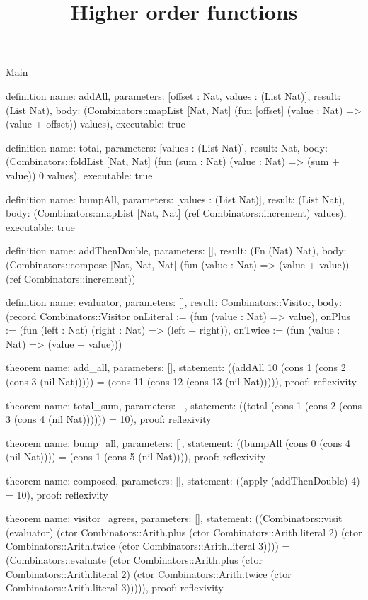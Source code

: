 \begin{lexlean}{Main}
\title{Higher order functions}
\begin{semanticmodule}
definition{
  name: addAll,
  parameters: [offset : Nat, values : (List Nat)],
  result: (List Nat),
  body: (Combinators::mapList [Nat, Nat] (fun [offset] (value : Nat) => (value + offset)) values),
  executable: true
}

definition{
  name: total,
  parameters: [values : (List Nat)],
  result: Nat,
  body: (Combinators::foldList [Nat, Nat] (fun (sum : Nat) (value : Nat) => (sum + value)) 0 values),
  executable: true
}

definition{
  name: bumpAll,
  parameters: [values : (List Nat)],
  result: (List Nat),
  body: (Combinators::mapList [Nat, Nat] (ref Combinators::increment) values),
  executable: true
}

definition{
  name: addThenDouble,
  parameters: [],
  result: (Fn (Nat) Nat),
  body: (Combinators::compose [Nat, Nat, Nat] (fun (value : Nat) => (value + value)) (ref Combinators::increment))
}

definition{
  name: evaluator,
  parameters: [],
  result: Combinators::Visitor,
  body: (record Combinators::Visitor {onLiteral := (fun (value : Nat) => value), onPlus := (fun (left : Nat) (right : Nat) => (left + right)), onTwice := (fun (value : Nat) => (value + value))})
}

theorem{
  name: add_all,
  parameters: [],
  statement: ((addAll 10 (cons 1 (cons 2 (cons 3 (nil Nat))))) = (cons 11 (cons 12 (cons 13 (nil Nat))))),
  proof: reflexivity{}
}

theorem{
  name: total_sum,
  parameters: [],
  statement: ((total (cons 1 (cons 2 (cons 3 (cons 4 (nil Nat)))))) = 10),
  proof: reflexivity{}
}

theorem{
  name: bump_all,
  parameters: [],
  statement: ((bumpAll (cons 0 (cons 4 (nil Nat)))) = (cons 1 (cons 5 (nil Nat)))),
  proof: reflexivity{}
}

theorem{
  name: composed,
  parameters: [],
  statement: ((apply (addThenDouble) 4) = 10),
  proof: reflexivity{}
}

theorem{
  name: visitor_agrees,
  parameters: [],
  statement: ((Combinators::visit (evaluator) (ctor Combinators::Arith.plus (ctor Combinators::Arith.literal 2) (ctor Combinators::Arith.twice (ctor Combinators::Arith.literal 3)))) = (Combinators::evaluate (ctor Combinators::Arith.plus (ctor Combinators::Arith.literal 2) (ctor Combinators::Arith.twice (ctor Combinators::Arith.literal 3))))),
  proof: reflexivity{}
}


\end{semanticmodule}
\end{lexlean}
